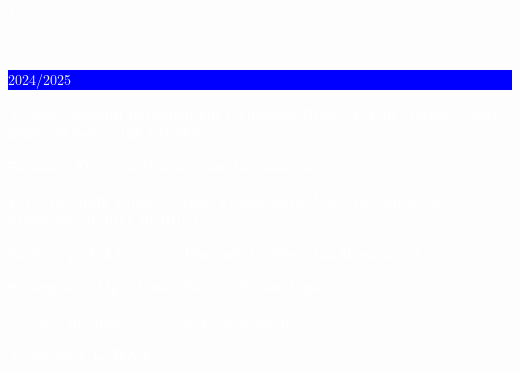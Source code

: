 \documentclass[a5paper, twoside]{article}
\begin{document}
\pagestyle{empty}
\pagecolor{red}
\noindent\hspace{-3pt}\textcolor{white}{\fontsize{20}{20} \Kapitan Jaroška}

\vspace*{\fill}


\noindent\hspace{-3pt}\textcolor{white}{\fontsize{25}{25} \Kapitan Průvodce prváka. \colorbox{blue}{\rule[5pt]{0pt}{15pt}\large 2024/2025}}

\vspace{1em}

\noindent\textcolor{white}{\textbf{Vydáno Školním parlamentem Gymnázia Brno, tř. Kpt. Jaroše v září 2024 nákladem 126 výtisků.}}

\vspace{1em}

\noindent \textcolor{white}{\textbf{Redakce: Dominik Doležel, Jan Romanovský}}

\vspace{1em}

\noindent \textcolor{white}{\textbf{Foto: Dominik Doležel, Hana Trubačíková, Mgr. Bc. Jaroslava Maříková, archivy institucí}}

\vspace{1em}

\noindent \textcolor{white}{\textbf{Sazba a grafická úprava: Dominik Doležel, Jan Romanovský}}

\vspace{1em}

\noindent \textcolor{white}{\textbf{Spolupráce: Mgr. Jana Sítařová, Šimon Lopour}}

\vspace{1em}

\noindent \textcolor{white}{\textbf{Účelová publikace -- výtisk je neprodejný.}}

\vspace{1em}

\noindent \textcolor{white}{\textbf{Vysázeno v \LaTeX u.}}
\end{document}

